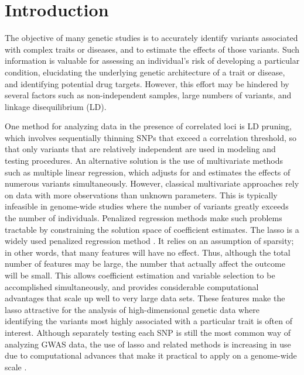 
\section{Introduction}

The objective of many genetic studies is to accurately identify variants associated with complex traits or diseases, and to estimate the effects of those variants. Such information is valuable for assessing an individual's risk of developing a particular condition, elucidating the underlying genetic architecture of a trait or disease, and identifying potential drug targets. However, this effort may be hindered by several factors such as non-independent samples, large numbers of variants, and linkage disequilibrium (LD).

One method for analyzing data in the presence of correlated loci is LD pruning, which involves sequentially thinning SNPs that exceed a correlation threshold, so that only variants that are relatively independent are used in modeling and testing procedures.
An alternative solution is the use of multivariate methods such as multiple linear regression, which adjusts for and estimates the effects of numerous variants simultaneously. However, classical multivariate approaches rely on data with more observations than unknown parameters. This is typically infeasible in genome-wide studies where the number of variants greatly exceeds the number of individuals. Penalized regression methods make such problems tractable by constraining the solution space of coefficient estimates. The lasso is a widely used penalized regression method \citep{tibshirani1996regression}. It relies on an assumption of sparsity; in other words, that many features will have no effect. Thus, although the total number of features may be large, the number that actually affect the outcome will be small. This allows coefficient estimation and variable selection to be accomplished simultaneously, and provides considerable computational advantages that scale up well to very large data sets. These features make the lasso attractive for the analysis of high-dimensional genetic data where identifying the variants most highly associated with a particular trait is often of interest. Although separately testing each SNP is still the most common way of analyzing GWAS data, the use of lasso and related methods is increasing in use due to computational advances that make it practical to apply on a genome-wide scale \citep{qian2020fast, prive2018efficient}.

